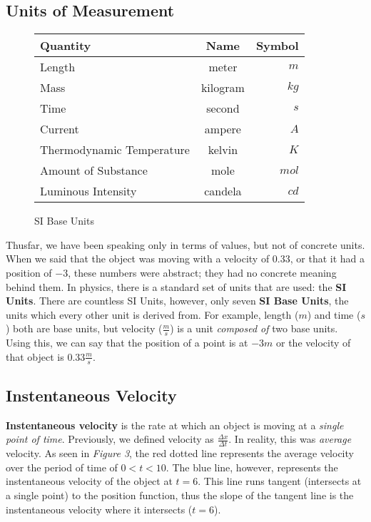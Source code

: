 \documentclass{article}
\newenvironment{nscenter}
  {\parskip=0pt\par\nopagebreak\centering}
  {\par\noindent\ignorespacesafterend}
\begin{document}
\subsection{Units of Measurement}
\begin{wrapfigure}{L}{10cm}
  \begin{nscenter}
    \caption{SI Base Units}
    \begin{tabular}{l|c|r}
      \toprule
      \textbf{Quantity} & \textbf{Name} & \textbf{Symbol} \\
      \midrule
      Length                    & meter    & $m$   \\
      Mass                      & kilogram & $kg$  \\
      Time                      & second   & $s$   \\
      Current                   & ampere   & $A$   \\
      Thermodynamic Temperature & kelvin   & $K$   \\
      Amount of Substance       & mole     & $mol$ \\
      Luminous Intensity        & candela  & $cd$  \\
      \bottomrule
    \end{tabular}
  \end{nscenter}
\end{wrapfigure}

Thusfar, we have been speaking only in terms of values, but not of concrete units. When we
said that the object was moving with a velocity of $0.33$, or that it had a position of $-3$,
these numbers were abstract; they had no concrete meaning behind them. In physics, there is 
a standard set of units that are used: the \textbf{SI Units}. There are countless SI Units, 
however, only seven \textbf{SI Base Units}, the units which every other unit is derived from. 
For example, length ($m$) and time ($s$) both are base units, but velocity ($\frac{m}{s}$)
is a unit \textit{composed of} two base units. Using this, we can say that the position of a
point is at $-3m$ or the velocity of that object is $0.33 \frac{m}{s}$.

\subsection{Instentaneous Velocity}
\textbf{Instentaneous velocity} is the rate at which an object is moving at a \textit{single point of time}.
Previously, we defined velocity as $\frac{\Delta x}{\Delta t}$. In reality, this was \textit{average}
velocity. As seen in \textit{Figure 3}, the red dotted line represents the average velocity over the 
period of time of $0<t<10$. The blue line, however, represents the instentaneous velocity
of the object at $t=6$. This line runs tangent (intersects at a single point) to the position function,
thus the slope of the tangent line is the instentaneous velocity where it intersects ($t=6$).
\end{document}
